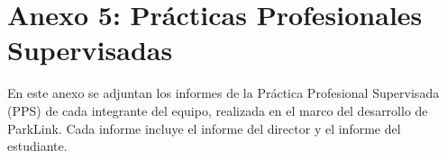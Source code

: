 \newpage
\section{Anexo 5: Prácticas Profesionales Supervisadas}\label{anexo:pps}

En este anexo se adjuntan los informes de la Práctica Profesional Supervisada (PPS) de cada integrante del equipo, realizada en el marco del desarrollo de ParkLink. Cada informe incluye el informe del director y el informe del estudiante.





